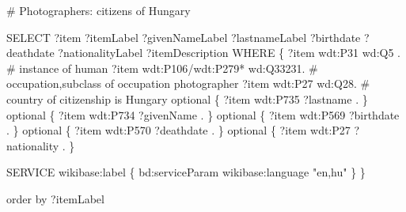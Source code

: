 \documentclass[
  letterpaper,
  DIV=11,
  numbers=noendperiod]{scrreprt}
\newenvironment{Shaded}{\begin{snugshade}}{\end{snugshade}}
\newcommand{\CommentTok}[1]{\textcolor[rgb]{0.37,0.37,0.37}{#1}}
\newcommand{\NormalTok}[1]{\textcolor[rgb]{0.00,0.23,0.31}{#1}}
\newcommand{\SpecialCharTok}[1]{\textcolor[rgb]{0.37,0.37,0.37}{#1}}
\newcommand{\StringTok}[1]{\textcolor[rgb]{0.13,0.47,0.30}{#1}}
\begin{document}
\begin{Shaded}
\begin{Highlighting}[]
\CommentTok{\# Photographers: citizens of Hungary}

\NormalTok{SELECT ?item ?itemLabel  ?givenNameLabel ?lastnameLabel ?birthdate ?deathdate ?nationalityLabel ?itemDescription WHERE \{}
\NormalTok{    ?item wdt}\SpecialCharTok{:}\NormalTok{P31 wd}\SpecialCharTok{:}\NormalTok{Q5 .                }\CommentTok{\# instance of human}
\NormalTok{    ?item wdt}\SpecialCharTok{:}\NormalTok{P106}\SpecialCharTok{/}\NormalTok{wdt}\SpecialCharTok{:}\NormalTok{P279}\SpecialCharTok{*}\NormalTok{ wd}\SpecialCharTok{:}\NormalTok{Q33231.  }\CommentTok{\# occupation,subclass of occupation photographer }
\NormalTok{    ?item wdt}\SpecialCharTok{:}\NormalTok{P27 wd}\SpecialCharTok{:}\NormalTok{Q28.                }\CommentTok{\# country of citizenship is Hungary  }
\NormalTok{    optional \{ ?item wdt}\SpecialCharTok{:}\NormalTok{P735 ?lastname . \}}
\NormalTok{    optional \{ ?item wdt}\SpecialCharTok{:}\NormalTok{P734 ?givenName . \}}
\NormalTok{    optional \{ ?item wdt}\SpecialCharTok{:}\NormalTok{P569 ?birthdate . \}}
\NormalTok{    optional \{ ?item wdt}\SpecialCharTok{:}\NormalTok{P570 ?deathdate . \}}
\NormalTok{    optional \{ ?item wdt}\SpecialCharTok{:}\NormalTok{P27 ?nationality . \}}

\NormalTok{  SERVICE wikibase}\SpecialCharTok{:}\NormalTok{label \{ bd}\SpecialCharTok{:}\NormalTok{serviceParam wikibase}\SpecialCharTok{:}\NormalTok{language }\StringTok{"en,hu"}\NormalTok{ \}}
\NormalTok{\}}

\NormalTok{order by ?itemLabel}
\end{Highlighting}
\end{Shaded}
\end{document}
